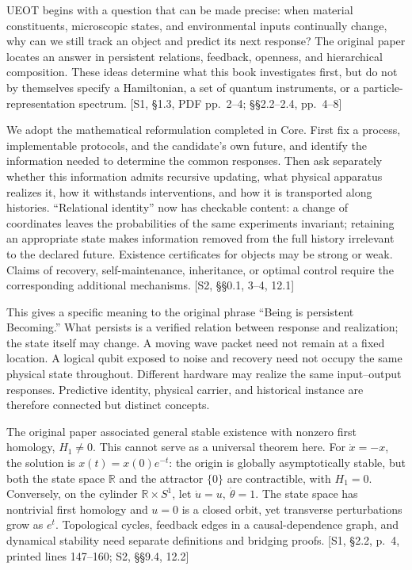 \documentclass[
  11pt,
  oneside]{book}
\begin{document}
UEOT begins with a question that can be made precise: when material
constituents, microscopic states, and environmental inputs continually
change, why can we still track an object and predict its next response?
The original paper locates an answer in persistent relations, feedback,
openness, and hierarchical composition. These ideas determine what this
book investigates first, but do not by themselves specify a Hamiltonian,
a set of quantum instruments, or a particle-representation spectrum.
{[}S1, §1.3, PDF pp.~2--4; §§2.2--2.4, pp.~4--8{]}

We adopt the mathematical reformulation completed in Core. First fix a
process, implementable protocols, and the candidate's own future, and
identify the information needed to determine the common responses. Then
ask separately whether this information admits recursive updating, what
physical apparatus realizes it, how it withstands interventions, and how
it is transported along histories. ``Relational identity'' now has
checkable content: a change of coordinates leaves the probabilities of
the same experiments invariant; retaining an appropriate state makes
information removed from the full history irrelevant to the declared
future. Existence certificates for objects may be strong or weak. Claims
of recovery, self-maintenance, inheritance, or optimal control require
the corresponding additional mechanisms. {[}S2, §§0.1, 3--4, 12.1{]}

This gives a specific meaning to the original phrase ``Being is
persistent Becoming.'' What persists is a verified relation between
response and realization; the state itself may change. A moving wave
packet need not remain at a fixed location. A logical qubit exposed to
noise and recovery need not occupy the same physical state throughout.
Different hardware may realize the same input--output responses.
Predictive identity, physical carrier, and historical instance are
therefore connected but distinct concepts.

The original paper associated general stable existence with nonzero
first homology, \(H_1\ne0\). This cannot serve as a universal theorem
here. For \(\dot x=-x\), the solution is \(x(t)=x(0)e^{-t}\): the origin
is globally asymptotically stable, but both the state space
\(\mathbb R\) and the attractor \(\{0\}\) are contractible, with
\(H_1=0\). Conversely, on the cylinder \(\mathbb R\times S^1\), let
\(\dot u=u,\ \dot\theta=1\). The state space has nontrivial first
homology and \(u=0\) is a closed orbit, yet transverse perturbations
grow as \(e^t\). Topological cycles, feedback edges in a
causal-dependence graph, and dynamical stability need separate
definitions and bridging proofs. {[}S1, §2.2, p.~4, printed lines
147--160; S2, §§9.4, 12.2{]}
\end{document}
